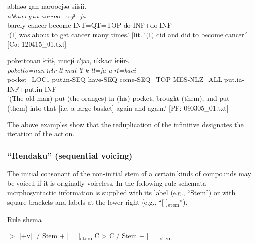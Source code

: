 \ex\label{ex:4.38b}     %
\glll    abɨnəə  gan  naroocjəə  siisii.\\
      \textit{abɨnəə}  \textit{gan}  \textit{nar-oo=ccjɨ=ja}  \textit{}\\
      barely  cancer  become-INT=QT=TOP  do-INF+do-INF\\
      \glt       ‘(I) was about to get cancer many times.’ [lit. ‘(I) did and did to become cancer’] [Co: 120415\_01.txt]

\ex\label{ex:4.38c}%
    \glll   {\textbar}poketto{\textbar}nan  ɨrɨtɨ,  mucjɨ  cˀjəə,  ukkaci   ɨrɨɨrɨ.  \\
      \textit{poketto=nan}  \textit{ɨrɨr-tɨ}  \textit{mut-tɨ}  \textit{k-tɨ=ja}  \textit{u-rɨ=kaci}    \textit{}  \\
      pocket=LOC1  put.in-SEQ  have-SEQ  come-SEQ=TOP  MES-NLZ=ALL   put.in-INF+put.in-INF  \\
      \glt       ‘(The old man) put (the oranges) in (his) pocket, brought (them), and put (them) into that [i.e. a large basket] again and again.’ [PF: 090305\_01.txt]
    \z
\z

The above examples show that the reduplication of the infinitive designates the iteration of the action.

\subsubsection{“Rendaku” (sequential voicing)}\label{sec:4.2.3.4}

The initial consonant of the non-initial stem of a certain kinds of compounds may be voiced if it is originally voiceless. In the following rule schemata, morphosyntactic information is supplied with its label (e.g., “Stem”) or with square brackets and labels at the lower right (e.g., “[    ]\textsubscript{stem}”).

\ea  Rule shema \label{ex:4.39}
\begin{tabbing}
[\textminus v] \hspace{\tabcolsep}\=\hspace{\tabcolsep} > \hspace{\tabcolsep}\=\hspace{\tabcolsep} [+v] \hspace{\tabcolsep}\=\hspace{\tabcolsep} /  Stem  +  [ \_   ]\textsubscript{stem}\kill
C              \> > \> C \> /  Stem  +  [ \_   ]\textsubscript{stem}\\\relax
[\textminus v] \>   \> [+v] \>
\end{tabbing}
\z

